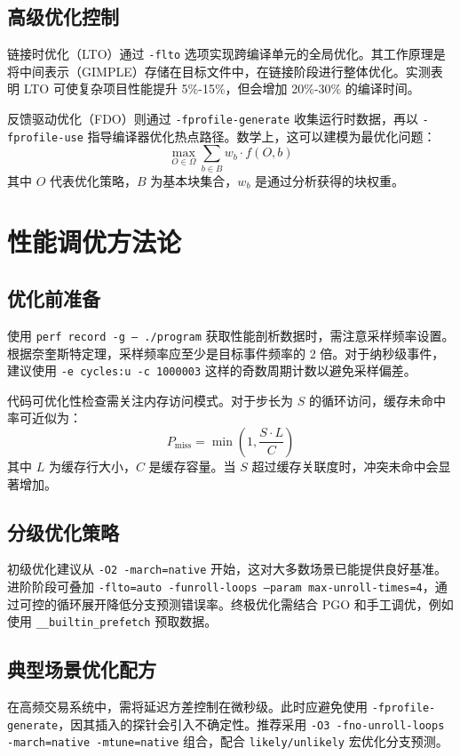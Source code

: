 \section{高级优化控制}
链接时优化（LTO）通过 \texttt{-flto} 选项实现跨编译单元的全局优化。其工作原理是将中间表示（GIMPLE）存储在目标文件中，在链接阶段进行整体优化。实测表明 LTO 可使复杂项目性能提升 5\%{}-15\%{}，但会增加 20\%{}-30\%{} 的编译时间。\par
反馈驱动优化（FDO）则通过 \texttt{-fprofile-generate} 收集运行时数据，再以 \texttt{-fprofile-use} 指导编译器优化热点路径。数学上，这可以建模为最优化问题：
$$ \max_{O \in \Omega} \sum_{b \in B} w_b \cdot f(O,b) $$
其中 $O$ 代表优化策略，$B$ 为基本块集合，$w_b$ 是通过分析获得的块权重。\par
\chapter{性能调优方法论}
\section{优化前准备}
使用 \texttt{perf record -g -- ./program} 获取性能剖析数据时，需注意采样频率设置。根据奈奎斯特定理，采样频率应至少是目标事件频率的 2 倍。对于纳秒级事件，建议使用 \texttt{-e cycles:u -c 1000003} 这样的奇数周期计数以避免采样偏差。\par
代码可优化性检查需关注内存访问模式。对于步长为 $S$ 的循环访问，缓存未命中率可近似为：
$$ P_{\text{miss}} = \min\left(1, \frac{S \cdot L}{C}\right) $$
其中 $L$ 为缓存行大小，$C$ 是缓存容量。当 $S$ 超过缓存关联度时，冲突未命中会显著增加。\par
\section{分级优化策略}
初级优化建议从 \texttt{-O2 -march=native} 开始，这对大多数场景已能提供良好基准。进阶阶段可叠加 \texttt{-flto=auto -funroll-loops --param max-unroll-times=4}，通过可控的循环展开降低分支预测错误率。终极优化需结合 PGO 和手工调优，例如使用 \texttt{\_{}\_{}builtin\_{}prefetch} 预取数据。\par
\section{典型场景优化配方}
在高频交易系统中，需将延迟方差控制在微秒级。此时应避免使用 \texttt{-fprofile-generate}，因其插入的探针会引入不确定性。推荐采用 \texttt{-O3 -fno-unroll-loops -march=native -mtune=native} 组合，配合 \texttt{likely/unlikely} 宏优化分支预测。\par
